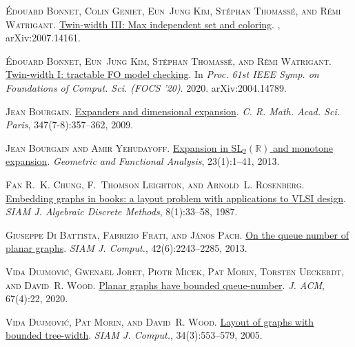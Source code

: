 \documentclass[kpfonts]{patmorin}
\begin{document}
	\textsc{\'Edouard Bonnet, Colin Geniet, Eun~Jung Kim, St\'ephan Thomass\'e, and
		R\'emi Watrigant}.
	\newblock \href{http://arxiv.org/abs/2007.14161}{Twin-width {III}: Max
		independent set and coloring}.
	, arXiv:2007.14161.
	
	\textsc{\'Edouard Bonnet, Eun~Jung Kim, St\'ephan Thomass\'e, and R\'emi
		Watrigant}.
	\newblock \href{http://arxiv.org/abs/2004.14789}{Twin-width {I}: tractable {FO}
		model checking}.
	\newblock In \emph{Proc. 61st IEEE Symp. on Foundations of Comput. Sci. (FOCS
		'20)}. 2020{}.
	\newblock arXiv:2004.14789.
	
	\textsc{Jean Bourgain}.
	\newblock \href{https://doi.org/10.1016/j.crma.2009.02.009}{Expanders and
		dimensional expansion}.
	\newblock \emph{C. R. Math. Acad. Sci. Paris}, 347(7-8):357--362, 2009.
	
	\textsc{Jean Bourgain and Amir Yehudayoff}.
	\newblock \href{https://doi.org/10.1007/s00039-012-0200-9}{Expansion in
		{SL$_2(\mathbb{R})$} and monotone expansion}.
	\newblock \emph{Geometric and Functional Analysis}, 23(1):1--41, 2013.
	
	\textsc{Fan R.~K. Chung, F.~Thomson Leighton, and Arnold~L. Rosenberg}.
	\newblock \href{https://doi.org/10.1137/0608002}{Embedding graphs in books: a
		layout problem with applications to {V}{L}{S}{I} design}.
	\newblock \emph{SIAM J. Algebraic Discrete Methods}, 8(1):33--58, 1987.
	
	\textsc{Giuseppe {Di Battista}, Fabrizio Frati, and J\'anos Pach}.
	\newblock \href{https://doi.org/10.1137/130908051}{On the queue number of
		planar graphs}.
	\newblock \emph{SIAM J. Comput.}, 42(6):2243--2285, 2013.
	
	\textsc{Vida Dujmovi{\'c}, Gwena\"{e}l Joret, Piotr Micek, Pat Morin, Torsten
		Ueckerdt, and David~R. Wood}.
	\newblock \href{https://doi.org/10.1145/3385731}{Planar graphs have bounded
		queue-number}.
	\newblock \emph{J. ACM}, 67(4):22, 2020.
	
	\textsc{Vida Dujmovi{\'c}, Pat Morin, and David~R. Wood}.
	\newblock \href{https://doi.org/10.1137/S0097539702416141}{Layout of graphs
		with bounded tree-width}.
	\newblock \emph{SIAM J. Comput.}, 34(3):553--579, 2005.
	
\end{document}
